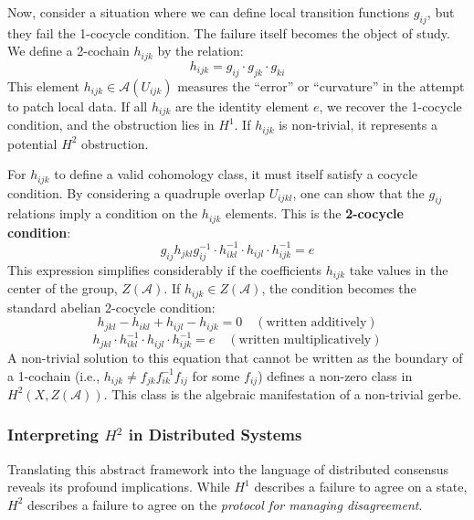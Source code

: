 \documentclass[
]{article}
\begin{document}
Now, consider a situation where we can define local transition functions
\(g_{ij}\), but they fail the 1-cocycle condition. The failure itself
becomes the object of study. We define a 2-cochain \(h_{ijk}\) by the
relation: \[
h_{ijk} = g_{ij} \cdot g_{jk} \cdot g_{ki}
\] This element \(h_{ijk} \in \mathcal{A}(U_{ijk})\) measures the
``error'' or ``curvature'' in the attempt to patch local data. If all
\(h_{ijk}\) are the identity element \(e\), we recover the 1-cocycle
condition, and the obstruction lies in \(H^1\). If \(h_{ijk}\) is
non-trivial, it represents a potential \(H^2\) obstruction.

For \(h_{ijk}\) to define a valid cohomology class, it must itself
satisfy a cocycle condition. By considering a quadruple overlap
\(U_{ijkl}\), one can show that the \(g_{ij}\) relations imply a
condition on the \(h_{ijk}\) elements. This is the \textbf{2-cocycle
condition}: \[
g_{ij} h_{jkl} g_{ij}^{-1} \cdot h_{ikl}^{-1} \cdot h_{ijl} \cdot h_{ijk}^{-1} = e
\] This expression simplifies considerably if the coefficients
\(h_{ijk}\) take values in the center of the group, \(Z(\mathcal{A})\).
If \(h_{ijk} \in Z(\mathcal{A})\), the condition becomes the standard
abelian 2-cocycle condition: \[
h_{jkl} - h_{ikl} + h_{ijl} - h_{ijk} = 0 \quad (\text{written additively})
\] \[
h_{jkl} \cdot h_{ikl}^{-1} \cdot h_{ijl} \cdot h_{ijk}^{-1} = e \quad (\text{written multiplicatively})
\] A non-trivial solution to this equation that cannot be written as the
boundary of a 1-cochain (i.e., \(h_{ijk} \neq f_{jk}f_{ik}^{-1}f_{ij}\)
for some \(f_{ij}\)) defines a non-zero class in
\(H^2(X, Z(\mathcal{A}))\). This class is the algebraic manifestation of
a non-trivial gerbe.

\subsubsection{\texorpdfstring{Interpreting \(H^2\) in Distributed
Systems}{Interpreting H\^{}2 in Distributed Systems}}\label{interpreting-h2-in-distributed-systems}

Translating this abstract framework into the language of distributed
consensus reveals its profound implications. While \(H^1\) describes a
failure to agree on a state, \(H^2\) describes a failure to agree on the
\emph{protocol for managing disagreement}.
\end{document}
